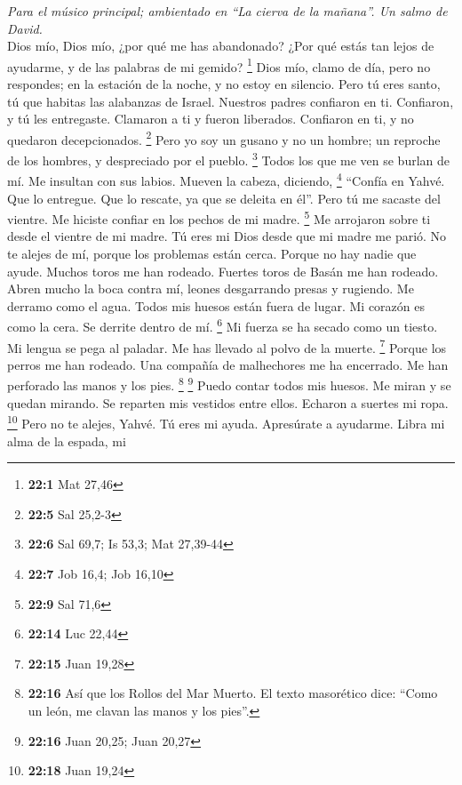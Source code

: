 \begin{paracol}{2}
\emph{Para el músico principal; ambientado en ``La cierva de la
mañana''. Un salmo de David.}\\
 Dios mío, Dios mío, ¿por qué me has abandonado? ¿Por qué
estás tan lejos de ayudarme, y de las palabras de mi gemido? \footnote{\textbf{22:1}
  Mat 27,46}  Dios mío, clamo de día, pero no respondes;
en la estación de la noche, y no estoy en silencio.  Pero
tú eres santo, tú que habitas las alabanzas de Israel. 
Nuestros padres confiaron en ti. Confiaron, y tú les entregaste.
 Clamaron a ti y fueron liberados. Confiaron en ti, y no
quedaron decepcionados. \footnote{\textbf{22:5} Sal 25,2-3}
 Pero yo soy un gusano y no un hombre; un reproche de los
hombres, y despreciado por el pueblo. \footnote{\textbf{22:6} Sal 69,7;
  Is 53,3; Mat 27,39-44}  Todos los que me ven se burlan
de mí. Me insultan con sus labios. Mueven la cabeza, diciendo,
\footnote{\textbf{22:7} Job 16,4; Job 16,10}  ``Confía en
Yahvé. Que lo entregue. Que lo rescate, ya que se deleita en él''.
 Pero tú me sacaste del vientre. Me hiciste confiar en los
pechos de mi madre. \footnote{\textbf{22:9} Sal 71,6}  Me
arrojaron sobre ti desde el vientre de mi madre. Tú eres mi Dios desde
que mi madre me parió.  No te alejes de mí, porque los
problemas están cerca. Porque no hay nadie que ayude. 
Muchos toros me han rodeado. Fuertes toros de Basán me han rodeado.
 Abren mucho la boca contra mí, leones desgarrando presas
y rugiendo.  Me derramo como el agua. Todos mis huesos
están fuera de lugar. Mi corazón es como la cera. Se derrite dentro de
mí. \footnote{\textbf{22:14} Luc 22,44}  Mi fuerza se ha
secado como un tiesto. Mi lengua se pega al paladar. Me has llevado al
polvo de la muerte. \footnote{\textbf{22:15} Juan 19,28} 
Porque los perros me han rodeado. Una compañía de malhechores me ha
encerrado. Me han perforado las manos y los pies. \footnote{\textbf{22:16}
  Así que los Rollos del Mar Muerto. El texto masorético dice: ``Como un
  león, me clavan las manos y los pies''.} \footnote{\textbf{22:16} Juan
  20,25; Juan 20,27}  Puedo contar todos mis huesos. Me
miran y se quedan mirando.  Se reparten mis vestidos
entre ellos. Echaron a suertes mi ropa. \footnote{\textbf{22:18} Juan
  19,24}  Pero no te alejes, Yahvé. Tú eres mi ayuda.
Apresúrate a ayudarme.  Libra mi alma de la espada, mi

\end{paracol}
